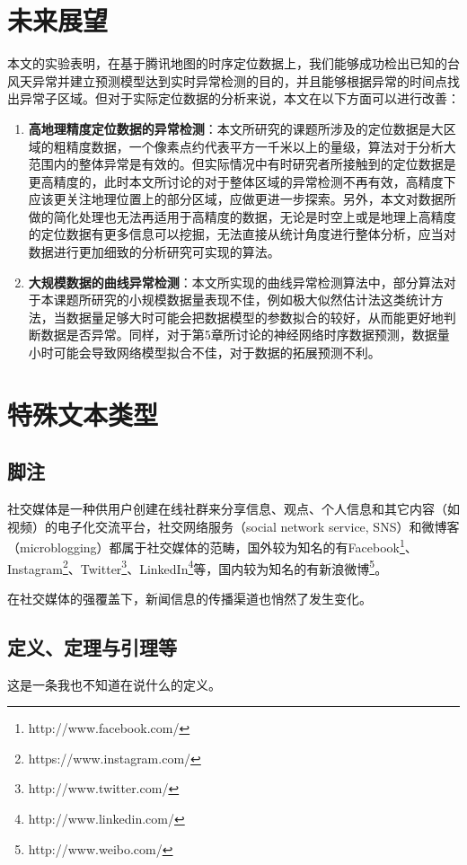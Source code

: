 \documentclass[a4paper,AutoFakeBold,oneside,12pt]{book}
\begin{document}
{{\section{未来展望}
本文的实验表明，在基于腾讯地图的时序定位数据上，我们能够成功检出已知的台风天异常并建立预测模型达到实时异常检测的目的，并且能够根据异常的时间点找出异常子区域。但对于实际定位数据的分析来说，本文在以下方面可以进行改善：
\begin{enumerate}
\item \textbf{高地理精度定位数据的异常检测}：本文所研究的课题所涉及的定位数据是大区域的粗精度数据，一个像素点约代表平方一千米以上的量级，算法对于分析大范围内的整体异常是有效的。但实际情况中有时研究者所接触到的定位数据是更高精度的，此时本文所讨论的对于整体区域的异常检测不再有效，高精度下应该更关注地理位置上的部分区域，应做更进一步探索。另外，本文对数据所做的简化处理也无法再适用于高精度的数据，无论是时空上或是地理上高精度的定位数据有更多信息可以挖掘，无法直接从统计角度进行整体分析，应当对数据进行更加细致的分析研究可实现的算法。
\item \textbf{大规模数据的曲线异常检测}：本文所实现的曲线异常检测算法中，部分算法对于本课题所研究的小规模数据量表现不佳，例如极大似然估计法这类统计方法，当数据量足够大时可能会把数据模型的参数拟合的较好，从而能更好地判断数据是否异常。同样，对于第5章所讨论的神经网络时序数据预测，数据量小时可能会导致网络模型拟合不佳，对于数据的拓展预测不利。
\end{enumerate}

\section{特殊文本类型}
\subsection{脚注}
社交媒体是一种供用户创建在线社群来分享信息、观点、个人信息和其它内容（如视频）的电子化交流平台，社交网络服务（social network service, SNS）和微博客（microblogging）都属于社交媒体的范畴\cite{webster_social_media}，国外较为知名的有Facebook\footnote{http://www.facebook.com/}、Instagram\footnote{https://www.instagram.com/}、Twitter\footnote{http://www.twitter.com/}、LinkedIn\footnote{http://www.linkedin.com/}等，国内较为知名的有新浪微博\footnote{http://www.weibo.com/}。

在社交媒体的强覆盖下，新闻信息的传播渠道也悄然了发生变化。\cite{false_news_spread_2018}

\subsection{定义、定理与引理等}
\begin{definition}
这是一条我也不知道在说什么的定义。\cite{周兴2017基于深度学习的谣言检测及模式挖掘}
\end{definition}

}}
\end{document}
